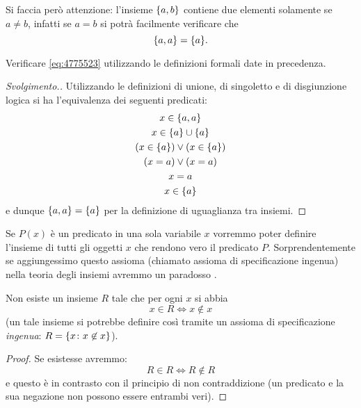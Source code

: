 Si faccia però attenzione: l'insieme ${\left\{ a,b \right\}}$ contiene due elementi
solamente se $a\neq b$, infatti se $a=b$ si potrà facilmente verificare
che
\begin{equation}\label{eq:4775523}
{\left\{ a,a \right\}} = {\left\{ a \right\}}.
\end{equation}

\begin{exercise}
  Verificare \eqref{eq:4775523} utilizzando le definizioni formali date in precedenza.
\end{exercise}
\begin{proof}[Svolgimento.]
Utilizzando le definizioni di unione, di singoletto e di disgiunzione logica
si ha l'equivalenza dei seguenti
predicati:
\begin{gather*}
  x \in {\left\{ a,a \right\}}  \\
  x \in {\left\{ a \right\}} \cup {\left\{ a \right\}}\\
  (x \in {\left\{ a \right\}}) \lor (x \in {\left\{ a \right\}})\\
  (x = a) \lor (x = a) \\
  x = a \\
  x \in {\left\{ a \right\}}
\end{gather*}
e dunque ${\left\{ a,a \right\}}={\left\{ a \right\}}$ per la definizione di uguaglianza tra insiemi.
\end{proof}

Se $P(x)$ è un predicato in una sola variabile $x$ vorremmo poter
definire l'insieme di tutti gli oggetti $x$ 
che rendono vero il predicato $P$.
Sorprendentemente se aggiungessimo questo assioma 
(chiamato assioma di specificazione ingenua) nella teoria degli insiemi
avremmo un paradosso%
%
%
%
%
%
.

\begin{theorem}
\label{th:Russell}%
Non esiste un insieme $R$ tale che per ogni $x$ si abbia
\[
   x\in R \iff x\not \in x
\]
(un tale insieme si potrebbe definire così
tramite un assioma di specificazione \emph{ingenua}: $R={\left\{ x\colon x\not \in x \right\}}$).
\end{theorem}
%
\begin{proof}
  Se esistesse avremmo:
  \[
    R \in R 
    \iff R\not \in R
  \]
  e questo è in contrasto
  con il principio di non contraddizione
  (un predicato e la sua negazione non possono essere entrambi veri).
\end{proof}

